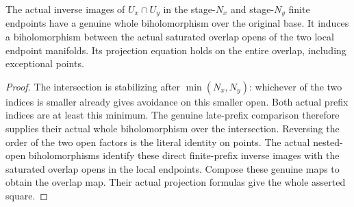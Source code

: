 \begin{theorem}
\label{hir:actual-locally-finite-history-whole-overlap-maps}
\leanok
The actual inverse images of $U_x\cap U_y$ in the stage-$N_x$ and
stage-$N_y$ finite endpoints have a genuine whole biholomorphism over the
original base. It induces a biholomorphism between the actual saturated
overlap opens of the two local endpoint manifolds. Its projection equation
holds on the entire overlap, including exceptional points.
\end{theorem}
\begin{proof}
The intersection is stabilizing after $\min(N_x,N_y)$: whichever of the
two indices is smaller already gives avoidance on this smaller open.
Both actual prefix indices are at least this minimum. The genuine late-prefix
comparison therefore supplies their actual whole biholomorphism over the
intersection. Reversing the order of the two open factors is the literal
identity on points. The actual nested-open biholomorphisms identify these
direct finite-prefix inverse images with the saturated overlap opens in the
local endpoints. Compose these genuine maps to obtain the overlap map.
Their actual projection formulas give the whole asserted square.
\end{proof}

